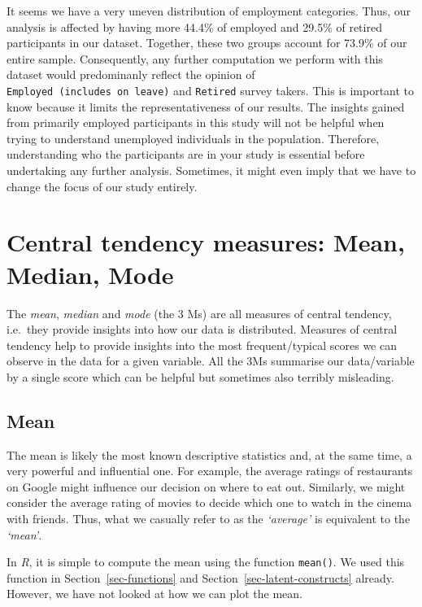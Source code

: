\documentclass[
  letterpaper,
  DIV=11,
  numbers=noendperiod]{scrreprt}
\begin{document}
It seems we have a very uneven distribution of employment categories.
Thus, our analysis is affected by having more 44.4\% of employed and
29.5\% of retired participants in our dataset. Together, these two
groups account for 73.9\% of our entire sample. Consequently, any
further computation we perform with this dataset would predominanly
reflect the opinion of \texttt{Employed\ (includes\ on\ leave)} and
\texttt{Retired} survey takers. This is important to know because it
limits the representativeness of our results. The insights gained from
primarily employed participants in this study will not be helpful when
trying to understand unemployed individuals in the population.
Therefore, understanding who the participants are in your study is
essential before undertaking any further analysis. Sometimes, it might
even imply that we have to change the focus of our study entirely.

\section{Central tendency measures: Mean, Median,
Mode}\label{sec-central-tendency}

The \emph{mean}, \emph{median} and \emph{mode} (the 3 Ms) are all
measures of central tendency, i.e.~they provide insights into how our
data is distributed. Measures of central tendency help to provide
insights into the most frequent/typical scores we can observe in the
data for a given variable. All the 3Ms summarise our data/variable by a
single score which can be helpful but sometimes also terribly
misleading.

\subsection{Mean}\label{sec-mean}

The mean is likely the most known descriptive statistics and, at the
same time, a very powerful and influential one. For example, the average
ratings of restaurants on Google might influence our decision on where
to eat out. Similarly, we might consider the average rating of movies to
decide which one to watch in the cinema with friends. Thus, what we
casually refer to as the \emph{`average'} is equivalent to the
\emph{`mean'}.

In \emph{R}, it is simple to compute the mean using the function
\texttt{mean()}. We used this function in Section~\ref{sec-functions}
and Section~\ref{sec-latent-constructs} already. However, we have not
looked at how we can plot the mean.
\end{document}
